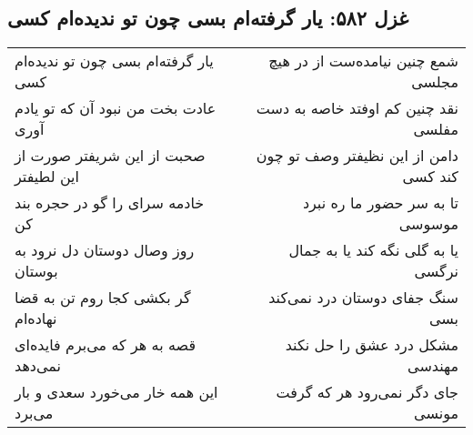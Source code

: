 \begin{center}
\section*{غزل ۵۸۲: یار گرفته‌ام بسی چون تو ندیده‌ام کسی}
\label{sec:582}
\begin{longtable}{l p{0.5cm} r}
یار گرفته‌ام بسی چون تو ندیده‌ام کسی
&&
شمع چنین نیامده‌ست از در هیچ مجلسی
\\
عادت بخت من نبود آن که تو یادم آوری
&&
نقد چنین کم اوفتد خاصه به دست مفلسی
\\
صحبت از این شریفتر صورت از این لطیفتر
&&
دامن از این نظیفتر وصف تو چون کند کسی
\\
خادمه سرای را گو در حجره بند کن
&&
تا به سر حضور ما ره نبرد موسوسی
\\
روز وصال دوستان دل نرود به بوستان
&&
یا به گلی نگه کند یا به جمال نرگسی
\\
گر بکشی کجا روم تن به قضا نهاده‌ام
&&
سنگ جفای دوستان درد نمی‌کند بسی
\\
قصه به هر که می‌برم فایده‌ای نمی‌دهد
&&
مشکل درد عشق را حل نکند مهندسی
\\
این همه خار می‌خورد سعدی و بار می‌برد
&&
جای دگر نمی‌رود هر که گرفت مونسی
\\
\end{longtable}
\end{center}
